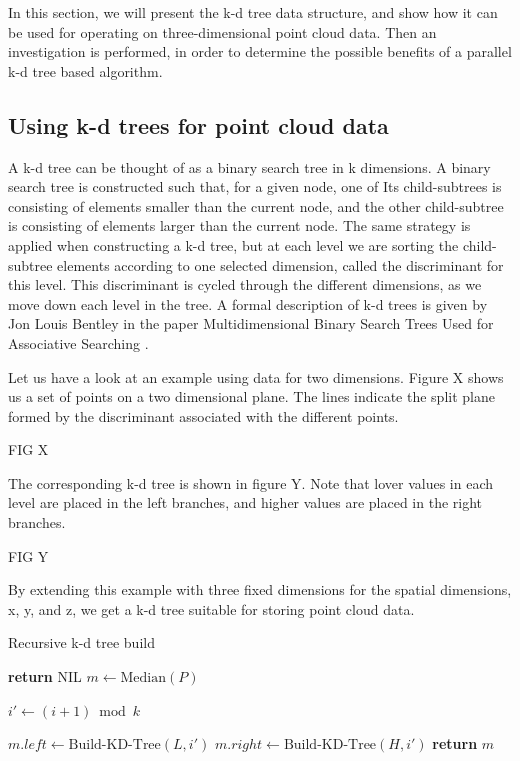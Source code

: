 In this section, we will present the k-d tree data structure, and show how it can be used for operating on three-dimensional point cloud data. Then an investigation is performed, in order to determine the possible benefits of a parallel k-d tree based algorithm.


\subsection{Using k-d trees for point cloud data} %
\label{ssub:using_k_d_trees_for_point_cloud_data}

A k-d tree can be thought of as a binary search tree in k dimensions. A binary search tree is constructed such that, for a given node, one of Its child-subtrees is consisting of elements smaller than the current node, and the other child-subtree is consisting of elements larger than the current node. The same strategy is applied when constructing a k-d tree, but at each level we are sorting the child-subtree elements according to one selected dimension, called the discriminant for this level. This discriminant is cycled through the different dimensions, as we move down each level in the tree. A formal description of k-d trees is given by Jon Louis Bentley in the paper Multidimensional Binary Search Trees Used for Associative Searching \cite{Bentley:1975:MBS:361002.361007}.

Let us have a look at an example using data for two dimensions. Figure X shows us a set of points on a two dimensional plane. The lines indicate the split plane formed by the discriminant associated with the different points.

FIG X

The corresponding k-d tree is shown in figure Y. Note that lover values in each level are placed in the left branches, and higher values are placed in the right branches.

FIG Y

By extending this example with three fixed dimensions for the spatial dimensions, x, y, and z, we get a k-d tree suitable for storing point cloud data.


\begin{algorithm}
\caption{Recursive k-d tree build}
\label{alg:seriel_tree_build}
\begin{algorithmic}
         
            \State \textbf{return} NIL 
        \Else
            \State $m \gets \text{Median}(P)$

            \State {}
            \State {}
            
            \State $i' \gets (i + 1) \bmod k$ 
            
            \State $m.left \gets \text{Build-KD-Tree}(L, i')$
            \State $m.right \gets \text{Build-KD-Tree}(H, i')$
        \EndIf
        \State \textbf{return} $m$
    \EndFunction
\end{algorithmic}
\end{algorithm}

